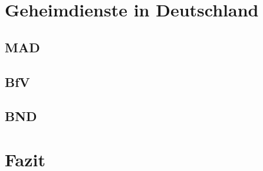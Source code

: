\documentclass[12pt,a4paper]{scrartcl}
\begin{document}
\section{Geheimdienste in Deutschland}

\subsection{MAD}

\subsection{BfV}

\subsection{BND}

\section{Fazit}

\newpage
\printbibliography
\end{document}

